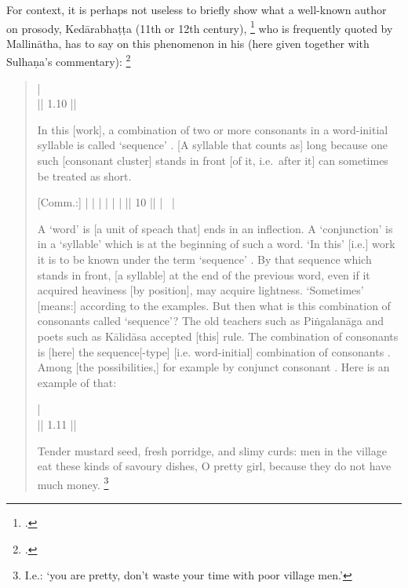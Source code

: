 For context, it is perhaps not useless to briefly show
what a well-known author on prosody, 
Kedārabhaṭṭa (11th or 12th century),%
		\footnote{.}
who is frequently quoted by Mallinātha, has to say on this
phenomenon in his
 (here given together with Sulhaṇa's  commentary):%
		\footnote{.}

\begin{quote}
 | \\
 || 1.10 ||

In this [work], a combination of two or more consonants
 in a word-initial syllable  is
called `sequence' . [A syllable that counts as] long because one
such [consonant cluster] stands in front [of it, i.e.\ after it] can 
sometimes be treated as short.

{\footnotesize [Comm.:] 
 | 
 |
 | 
 | 
 | 
 |
|| 10 || 
 | 
~|

A `word' is [a unit of speach that] ends in an inflection. 
A `conjunction' is in a `syllable' which is
at the beginning of such a word. 
`In this' [i.e.] work it is to be known under the 
term `sequence' . By that sequence which stands in front, 
[a syllable] at the end of the previous word, even if it acquired
heaviness [by position], may acquire lightness. `Sometimes' [means:]
according to the examples.
But then what is this combination of consonants called `sequence'?
The old teachers such as Piṅgalanāga and poets such as Kālidāsa
accepted [this] rule. The combination of consonants 
is [here] the sequence[-type]  [i.e. word-initial] 
combination of consonants .
Among [the possibilities,] for example by conjunct consonant 
.
Here is an example of that:}

 |\\
 || 1.11 ||

Tender mustard seed, fresh porridge, and slimy curds: men in the village eat
these kinds of savoury dishes, O pretty girl, because they do not have
much money.%
	\footnote{I.e.: `you are pretty, don't waste your time with poor village men.'}
\end{quote}

